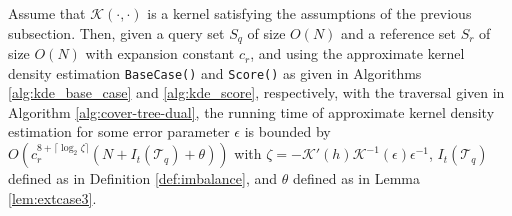 \begin{thm}
Assume that $\mathcal{K}(\cdot, \cdot)$ is a kernel satisfying the assumptions
of the previous subsection.  Then, given a query set $S_q$ of size $O(N)$ and a
reference set $S_r$ of size $O(N)$ with expansion constant $c_r$, and using the
approximate kernel density estimation \texttt{BaseCase()} and \texttt{Score()}
as given in Algorithms \ref{alg:kde_base_case} and \ref{alg:kde_score},
respectively, with the traversal given in Algorithm \ref{alg:cover-tree-dual},
the running time of approximate kernel density estimation for some error
parameter $\epsilon$ is bounded by
$O(c_r^{8 + \lceil \log_2 \zeta \rceil} (N + I_t(\mathscr{T}_q) + \theta))$
with $\zeta = -\mathcal{K}'(h) \mathcal{K}^{-1}(\epsilon) \epsilon^{-1}$,
$I_t(\mathscr{T}_q)$ defined as in Definition \ref{def:imbalance}, and $\theta$
defined as in Lemma \ref{lem:extcase3}.

\label{thm:kde-bound}
\end{thm}


